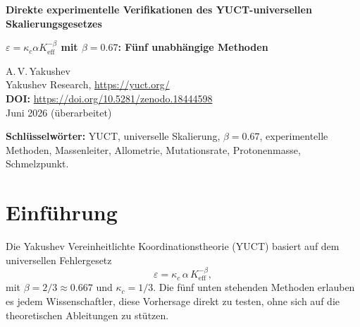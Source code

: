 \documentclass[12pt,a4paper]{article}
\newcommand{\Ke}{K_{\mathrm{eff}}}
\begin{document}
	
	\begin{center}
		{\Large \textbf{Direkte experimentelle Verifikationen des YUCT-universellen Skalierungsgesetzes}}
	\end{center}
	\begin{center}
		{\Large \textbf{\(\varepsilon = \kappa_c \alpha \Ke^{-\beta}\) mit \(\beta = 0.67\): Fünf unabhängige Methoden}}
	\end{center}
	
	\vspace{0.5cm}
	\noindent
	A.\,V.\,Yakushev\\
	Yakushev Research, \url{https://yuct.org/}\\
	\vspace{0.3cm}
	\textbf{DOI:} \url{https://doi.org/10.5281/zenodo.18444598}\\
	\noindent
	Juni 2026 (überarbeitet)
	
	\vspace{0.5cm}
	
	\begin{abstract}
		\noindent
		Diese Notiz präsentiert fünf unabhängige, numerisch verifizierte experimentelle
		Methoden, die eine direkte Bestätigung der zentralen Vorhersage der
		Yakushev Vereinheitlichten Koordinationstheorie (YUCT) erlauben: Der universelle
		Fehlerskalierungsexponent ist \(\beta = 0.67\). Jede Methode verwendet öffentlich
		zugängliche Daten, benötigt nur einen Taschenrechner und kann von einem
		Studenten in einem Nachmittag reproduziert werden. Die Tests umfassen
		Teilchenphysik, Biologie, Evolutionsgenetik und Materialwissenschaften.
	\end{abstract}
	
	\vspace{0.5cm}
	
	\noindent
	\textbf{Schlüsselwörter:} YUCT, universelle Skalierung, \(\beta = 0.67\), experimentelle
	Methoden, Massenleiter, Allometrie, Mutationsrate, Protonenmasse, Schmelzpunkt.
	
	\section{Einführung}
	
	Die Yakushev Vereinheitlichte Koordinationstheorie (YUCT) basiert auf dem
	universellen Fehlergesetz
	\begin{equation}\label{eq:error-law}
		\varepsilon = \kappa_c \, \alpha \, \Ke^{-\beta},
	\end{equation}
	mit \(\beta = 2/3 \approx 0.667\) und \(\kappa_c = 1/3\). Die fünf unten
	stehenden Methoden erlauben es jedem Wissenschaftler, diese Vorhersage direkt
	zu testen, ohne sich auf die theoretischen Ableitungen zu stützen.
	
\end{document}
